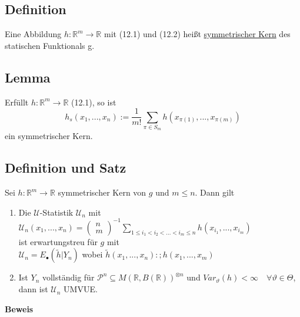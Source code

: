 \documentclass[german,10pt,oneside, fleqn, a4paper]{article}
\newcommand {\R}	{\mathbb{R}}
\newcommand{\ra}{\rightarrow}
\newcommand{\mat}[1]{\begin{pmatrix}#1\end{pmatrix}}
\newcommand{\mc}[1]{\mathcal{#1}}
\newcommand{\beweis}{\textbf{Beweis}\\}
\newcommand{\1}[1]{1_{#1}}
\newcommand{\2}[1]{\1{\brac{#1}}}
\newcommand{\p}{\mc{P}}
\newcommand{\uu}{\mc{U}}
\newcommand{\qf}{\quad\forall}
\newcommand{\stuff}{{\otimes n}}
\begin{document}
\subsection{Definition}
\label{12.4}
Eine Abbildung $h:\R^m\ra\R$ mit (12.1) und (12.2) heißt \underline{symmetrischer Kern} des statischen Funktionals g.

\subsection{Lemma}
\label{12.5}
Erfüllt $h:\R^m\ra\R$ (12.1), so ist \[h_s(x_1,...,x_n):=\dfrac{1}{m!}\sum\limits_{\pi\in S_m}h(x_{\pi(1)},...,x_{\pi(m)})\]
ein symmetrischer Kern.

\subsection{Definition und Satz}
\label{12.6}
Sei $h:\R^m\ra\R$ symmetrischer Kern von $g$ und $m\leq n$. Dann gilt\begin{enumerate}[label=(\alph*)]
\item Die $\uu$-Statistik $\uu_n$ mit \\
$\uu_n(x_1,...,x_n)=\mat{n\\m}^{-1}\sum\limits_{1\leq i_1<i_2<...<i_m\leq n}h(x_{i_1},...,x_{i_m})$\\
ist erwartungstreu für $g$ mit \\
$\uu_n=E_\bullet(\tilde h|Y_n)$ wobei $\tilde h(x_1,...,x_n):;h(x_1,...,x_m)$
\item Ist $Y_n$ vollständig für $\p^n\subseteq M(\R,B(\R))^\stuff$ und $Var_\vartheta(h)<\infty\qf\vartheta\in\Theta$, dann ist $\uu_n$ UMVUE.\\

\end{enumerate}
\beweis
\end{document}
